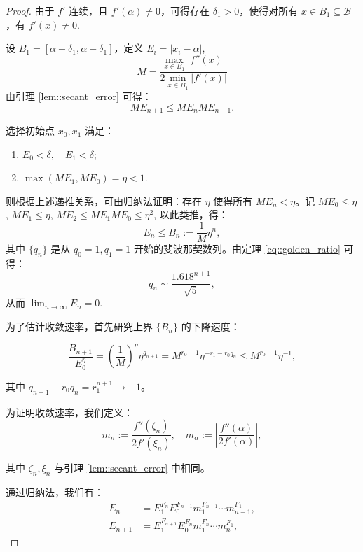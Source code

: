 \documentclass[a4paper]{ctexart}
\numberwithin{theorem}{section}
\numberwithin{equation}{section}
\numberwithin{figure}{section}
\numberwithin{remark}{section}
\begin{document}
\begin{proof}
由于 \( f' \) 连续，且 \( f'(\alpha) \ne 0 \)，可得存在 \( \delta_1 > 0 \)，使得对所有 \( x \in B_1 \subseteq \mathcal{B} \)，有 \( f'(x) \ne 0 \).

设 \( B_1 = [\alpha - \delta_1, \alpha + \delta_1] \)，定义 \( E_i = |x_i - \alpha| \),
\[
M = \frac{\displaystyle \max_{x \in B_1} |f''(x)|}{\displaystyle 2 \min_{x \in B_1} |f'(x)|}
\]
由引理 \ref{lem::secant_error} 可得：
\begin{equation*}
ME_{n+1} \leq ME_n ME_{n-1}.
\end{equation*}

选择初始点 \(x_0, x_1\) 满足：

\begin{enumerate}
    \item \( E_0 < \delta, \quad E_1 < \delta \);
    \item \( \max(ME_1, ME_0) = \eta < 1 \).
\end{enumerate}

则根据上述递推关系，可由归纳法证明：存在 \(\eta\) 使得所有 \( ME_n < \eta \)。记 \( ME_0 \leq \eta \),
 \( ME_1 \leq \eta \), 
 \( ME_2 \leq ME_1 ME_0 \leq \eta^2 \), 以此类推，得：
\[
E_n \leq B_n := \frac{1}{M} \eta^n,
\]
其中 \( \{q_n\} \) 是从 \( q_0 = 1, q_1 = 1 \) 开始的斐波那契数列。由定理 \ref{eq::golden_ratio} 可得：
\[
q_n \sim \frac{1.618^{n+1}}{\sqrt{5}},
\]
从而 \( \lim_{n \to \infty} E_n = 0 \).

为了估计收敛速率，首先研究上界 \( \{B_n\} \) 的下降速度：

\begin{equation*}
\frac{B_{n+1}}{E_0^\eta} = \left( \frac{1}{M} \right)^\eta \eta^{q_{n+1}} = M^{r_0 - 1} \eta^{-r_1 - r_0 q_n} \leq M^{r_0 - 1} \eta^{-1},
\end{equation*}

其中 \( q_{n+1} - r_0 q_n = r_1^{n+1} \to -1 \)。

为证明收敛速率，我们定义：
\begin{equation}
m_n := \frac{f''(\zeta_n)}{2f'(\xi_n)}, \quad m_\alpha := \left| \frac{f''(\alpha)}{2f'(\alpha)} \right|,
\end{equation}

其中 \( \zeta_n, \xi_n \) 与引理 \ref{lem::secant_error} 中相同。

通过归纳法，我们有：
\begin{align*}
E_n &= E_1^{{F_n}} E_0^{{F_{n-1}}} m_1^{F_{n-1}} \cdots m_{n-1}^{F_1}, \\
E_{n+1} &= E_1^{F_{n+1}} E_0^{F_n} m_1^{F_n} \cdots m_n^{F_1},
\end{align*}


\end{proof}
\end{document}
